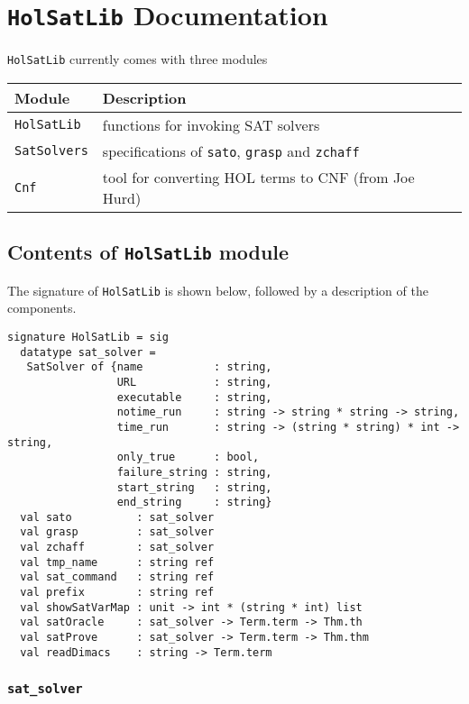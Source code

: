 \documentclass[12pt]{article}
\renewcommand{\t}[1]{\mbox{\small\tt #1}}
\newcommand\HOL{HOL\xspace}
\begin{document}
\section{{\tt HolSatLib} Documentation}

{\tt HolSatLib} currently comes with three
modules


\medskip

\begin{tabular}{ll}
{\bf Module} & {\bf Description} \\ \hline
{\tt HolSatLib} & functions for invoking SAT solvers\\
{\tt SatSolvers} & specifications of \t{sato}, \t{grasp} and \t{zchaff}\\
{\tt Cnf} & tool for converting \HOL terms to CNF (from Joe Hurd)
\end{tabular}

\medskip

\subsection{Contents of {\tt HolSatLib} module}

The signature of {\tt HolSatLib} is shown below, followed
by a description of the components.

{\small\begin{verbatim}
signature HolSatLib = sig
  datatype sat_solver = 
   SatSolver of {name           : string,
                 URL            : string,
                 executable     : string,    
                 notime_run     : string -> string * string -> string,    
                 time_run       : string -> (string * string) * int -> string,      
                 only_true      : bool,
                 failure_string : string,
                 start_string   : string,  
                 end_string     : string}
  val sato          : sat_solver
  val grasp         : sat_solver
  val zchaff        : sat_solver
  val tmp_name      : string ref
  val sat_command   : string ref
  val prefix        : string ref
  val showSatVarMap : unit -> int * (string * int) list
  val satOracle     : sat_solver -> Term.term -> Thm.th
  val satProve      : sat_solver -> Term.term -> Thm.thm
  val readDimacs    : string -> Term.term
\end{verbatim}}

\subsubsection{\tt sat\_solver}
\end{document}
